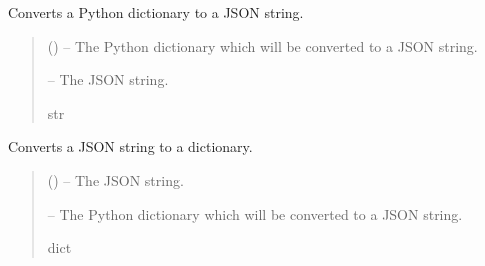 \documentclass[letterpaper,11pt,english]{sphinxmanual}
\begin{document}
\begin{savenotes}\begin{fulllineitems}
\label{\detokenize{code/opihiexarata.library.json:opihiexarata.library.json.dictionary_to_json}}
\pysigstartsignatures
{}
\pysigstopsignatures
\sphinxAtStartPar
Converts a Python dictionary to a JSON string.
\begin{quote}\begin{description}
\sphinxAtStartPar
{} () – The Python dictionary which will be converted to a JSON string.

\sphinxAtStartPar
{} – The JSON string.

\sphinxAtStartPar
str

\end{description}\end{quote}

\end{fulllineitems}\end{savenotes}


\begin{savenotes}\begin{fulllineitems}
\label{\detokenize{code/opihiexarata.library.json:opihiexarata.library.json.json_to_dictionary}}
\pysigstartsignatures
{}
\pysigstopsignatures
\sphinxAtStartPar
Converts a JSON string to a dictionary.
\begin{quote}\begin{description}
\sphinxAtStartPar
{} () – The JSON string.

\sphinxAtStartPar
{} – The Python dictionary which will be converted to a JSON string.

\sphinxAtStartPar
dict

\end{description}\end{quote}

\end{fulllineitems}\end{savenotes}
\end{document}
